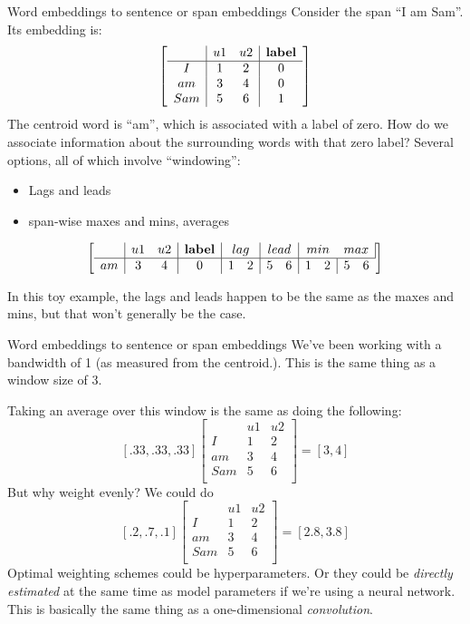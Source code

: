 \documentclass[10pt]{beamer}
\begin{document}
\begin{frame}{Word embeddings to sentence or span embeddings}
Consider the span ``I am Sam''.  Its embedding is:
\[\left[\begin{array}{c|cc|c}
     & u1 & u2 & \text{\textbf{label}}\\
     \hline
I    & 1 & 2 & 0\\
am   & 3 & 4 & 0 \\
Sam  & 5 & 6 & 1  \\
\end{array}\right]\]
The centroid word is ``am'', which is associated with a label of zero.  How do we associate information about the surrounding words with that zero label?  Several options, all of which involve ``windowing'':
\begin{itemize}
\item Lags and leads
\item span-wise maxes and mins, averages
\end{itemize}
\[\left[\begin{array}{c|cc|c|cc|cc|cc|cc}
     & u1 & u2 & \text{\textbf{label}} & \multicolumn{2}{c|}{lag}& \multicolumn{2}{c|}{lead} & \multicolumn{2}{c}{min}& \multicolumn{2}{c|}{max}\\
     \hline
am   & 3 & 4 & 0 &1 &2 & 5 & 6 &1 &2 & 5 & 6\\
\end{array}\right]\]

In this toy example, the lags and leads happen to be the same as the maxes and mins, but that won't generally be the case.
\end{frame}

\begin{frame}{Word embeddings to sentence or span embeddings}
We've been working with a bandwidth of 1 (as measured from the centroid.). This is the same thing as a window size of 3.

Taking an average over this window is the same as doing the following:
\[[.33, .33,  .33]\left[\begin{array}{c|cc}
     & u1 & u2\\
     \hline
I    & 1 & 2\\
am   & 3 & 4\\
Sam  & 5 & 6\\
\end{array}\right]
= [3, 4]
\] 
But why weight evenly?  We could do
\[[.2, .7,  .1]\left[\begin{array}{c|cc}
     & u1 & u2\\
     \hline
I    & 1 & 2\\
am   & 3 & 4\\
Sam  & 5 & 6\\
\end{array}\right]
= [2.8, 3.8]
\] 
Optimal weighting schemes could be hyperparameters.  Or they could be \textit{directly estimated} at the same time as model parameters if we're using a neural network.  This is basically the same thing as a one-dimensional \textit{convolution}.
\end{frame}
\end{document}
